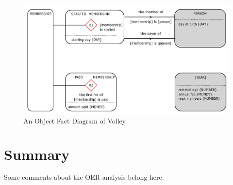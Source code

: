 \begin{figure}[h]\centering
	\includegraphics[width=12cm]{pic/VolleyOFD.png}
	\caption{An Object Fact Diagram of Volley~\cite{dietz2020enterprise}}
	\label{fig:ofdModel}
\end{figure}


\section{Summary}

Some comments about the OER analysis belong here.
